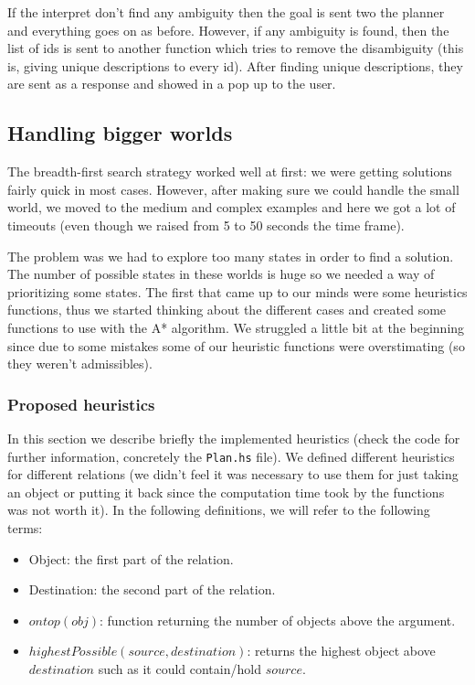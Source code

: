 \documentclass[11pt]{article}
\begin{document}
          If the interpret don't find any ambiguity then the goal is sent two the planner 
          and everything goes on as before. However, if any ambiguity is found, then the 
          list of ids is sent to another function which tries to remove the disambiguity 
          (this is, giving unique descriptions to every id). After finding unique 
          descriptions, they are sent as a response and showed in a pop up to the user.

        \subsection{Handling bigger worlds}
        The breadth-first search strategy worked well at first: we were getting solutions 
        fairly quick in most cases. However, after making sure we could handle the small 
        world, we moved to the medium and complex examples and here we got a lot of timeouts 
        (even though we raised from 5 to 50 seconds the time frame).

        The problem was we had to explore too many states in order to find a solution. The 
        number of possible states in these worlds is huge so we needed a way of prioritizing 
        some states. The first that came up to our minds were some heuristics functions, thus 
        we started thinking about the different cases and created some functions to use with 
        the A* algorithm. We struggled a little bit at the beginning since due to some mistakes
        some of our heuristic functions were overstimating (so they weren't admissibles).
        
        \subsubsection{Proposed heuristics}
        In this section we describe briefly the implemented heuristics (check the code for
         further information, concretely the \texttt{Plan.hs} file). We defined different 
         heuristics for different relations (we didn't feel it was necessary to use them 
         for just taking an object or putting it back since the computation time took by the
         functions was not worth it). In the following definitions, we will refer to the 
         following terms:

         \begin{itemize}
          \item Object: the first part of the relation.
          \item Destination: the second part of the relation.
          \item $ontop(obj)$: function returning the number of objects above the argument.
          \item $highestPossible(source, destination)$: returns the highest object 
          above $destination$ such as it could contain/hold $source$.
         \end{itemize}
\end{document}
